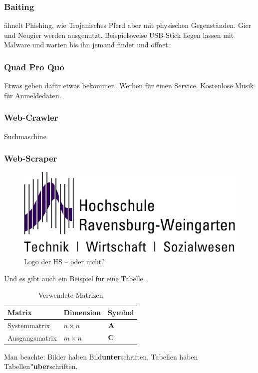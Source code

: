\subsubsection{Baiting}
ähnelt Phishing, wie Trojanisches Pferd aber mit physischen Gegenständen. Gier und Neugier werden ausgenutzt. Beispielsweise USB-Stick liegen lassen mit Malware und warten bis ihn jemand findet und öffnet.

\subsubsection{Quad Pro Quo}
Etwas geben dafür etwas bekommen. Werben für einen Service. Kostenlose Musik für Anmeldedaten.

\subsubsection{Web-Crawler}
Suchmaschine
\subsubsection{Web-Scraper}

\FloatBarrier
\begin{figure}
 \begin{center}
  \includegraphics*{bilder/HSLogoWGd}
  \caption{Logo der HS -- oder nicht?}
  \label{fig:logo}
 \end{center}
\end{figure}

Und es gibt auch ein Beispiel für eine Tabelle.

\begin{table}
 \begin{center}
 \caption{Verwendete Matrizen}
 \label{matrizen}
  \begin{tabular}{|l|l|l|}
   \hline
   Matrix & Dimension & Symbol \\
   \hline
   Systemmatrix & $n \times n$ & ${\bf A}$  \\
   \hline
   Ausgangsmatrix & $m \times n$ & ${\bf C}$  \\
   \hline
  \end{tabular}
 \end{center}
\end{table}
\FloatBarrier
Man beachte: Bilder haben Bild{\bf unter}schriften, 
Tabellen haben Tabellen{\bf "uber}schriften.

